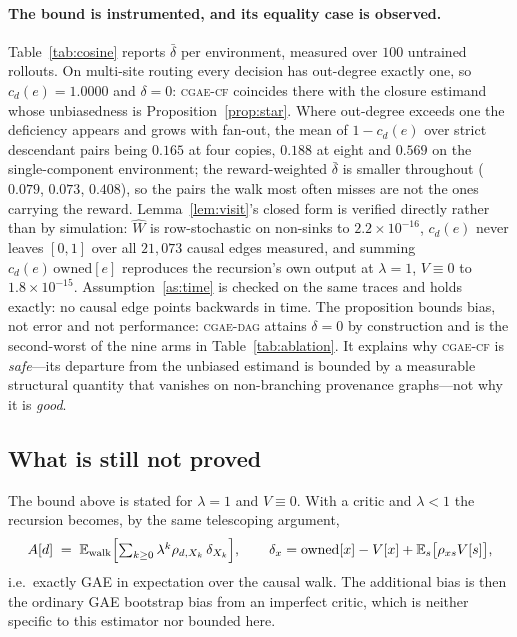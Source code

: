 \documentclass[review,authoryear,3p,times]{elsarticle}
\newcommand{\cflow}{\textsc{cgae-cf}}          %
\newcommand{\cdag}{\textsc{cgae-dag}}          %
\newcommand{\Ex}{\mathbb{E}}
\begin{document}
\paragraph{The bound is instrumented, and its equality case is observed.}
Table~\ref{tab:cosine} reports $\bar\delta$ per environment, measured over
$100$ untrained rollouts. On multi-site routing every decision has out-degree
exactly one, so $c_d(e)=1.0000$ and $\delta=0$: \cflow{} coincides there with
the closure estimand whose unbiasedness is Proposition~\ref{prop:star}. Where
out-degree exceeds one the deficiency appears and grows with fan-out, the mean
of $1-c_d(e)$ over strict descendant pairs being $0.165$ at four copies,
$0.188$ at eight and $0.569$ on the single-component environment; the
reward-weighted $\bar\delta$ is smaller throughout ($0.079$, $0.073$, $0.408$),
so the pairs the walk most often misses are not the ones carrying the reward.
Lemma~\ref{lem:visit}'s closed form is verified directly rather than by
simulation: $\hat W$ is row-stochastic on non-sinks to $2.2\times10^{-16}$,
$c_d(e)$ never leaves $[0,1]$ over all $21{,}073$ causal edges measured, and
summing $c_d(e)\,\mathrm{owned}[e]$ reproduces the recursion's own output at
$\lambda=1$, $V\equiv0$ to $1.8\times10^{-15}$. Assumption~\ref{as:time} is
checked on the same traces and holds exactly: no causal edge points backwards
in time. The proposition
bounds bias, not error and not performance: \cdag{} attains $\delta=0$ by
construction and is the second-worst of the nine arms in
Table~\ref{tab:ablation}. It explains why \cflow{} is \emph{safe}---its
departure from the unbiased estimand is bounded by a measurable structural
quantity that vanishes on non-branching provenance graphs---not why it is
\emph{good}.

\subsection{What is still not proved}

The bound above is stated for $\lambda=1$ and $V\equiv0$. With a critic and
$\lambda<1$ the recursion becomes, by the same telescoping argument,
\[
  A[d] \;=\; \Ex_{\text{walk}}\Bigl[\textstyle\sum_{k\ge0}
             \lambda^{k}\rho_{d,X_k}\,\delta_{X_k}\Bigr],
  \qquad
  \delta_x=\mathrm{owned}[x]-V[x]+\Ex_{s}\bigl[\rho_{xs}V[s]\bigr],
\]
i.e.\ exactly GAE in expectation over the causal walk. The additional bias is
then the ordinary GAE bootstrap bias from an imperfect critic, which is neither
specific to this estimator nor bounded here.
\end{document}
